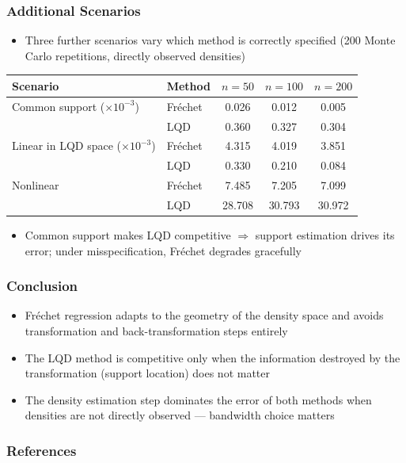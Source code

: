 \documentclass[11pt, aspectratio=169]{beamer}
\begin{document}
\begin{frame}
    \frametitle{Additional Scenarios}
    \begin{itemize}
        \item Three further scenarios vary which method is correctly specified
        (200 Monte Carlo repetitions, directly observed densities)
    \end{itemize}
    \begin{table}
        \centering
        \small
        \begin{tabular}{llccc}
            \hline
            Scenario & Method & $n = 50$ & $n = 100$ & $n = 200$ \\
            \hline
            Common support ($\times 10^{-3}$)  & Fréchet & 0.026 & 0.012 & 0.005 \\
                                               & LQD     & 0.360 & 0.327 & 0.304 \\
            Linear in LQD space ($\times 10^{-3}$) & Fréchet & 4.315 & 4.019 & 3.851 \\
                                               & LQD     & 0.330 & 0.210 & 0.084 \\
            Nonlinear                          & Fréchet & 7.485 & 7.205 & 7.099 \\
                                               & LQD     & 28.708 & 30.793 & 30.972 \\
            \hline
        \end{tabular}
    \end{table}
    \begin{itemize}
        \item Common support makes LQD competitive $\Rightarrow$ support estimation
        drives its error; under misspecification, Fréchet degrades gracefully
    \end{itemize}
\end{frame}

\begin{frame}
    \frametitle{Conclusion}
    \begin{itemize}
        \item Fréchet regression adapts to the geometry of the density space and
        avoids transformation and back-transformation steps entirely
        \item The LQD method is competitive only when the information destroyed by
        the transformation (support location) does not matter
        \item The density estimation step dominates the error of both methods when
        densities are not directly observed --- bandwidth choice matters
    \end{itemize}
\end{frame}


\begin{frame}[allowframebreaks]
    \frametitle{References}
    \renewcommand{\bibfont}{\normalfont\footnotesize}
    \printbibliography
\end{frame}
\end{document}
